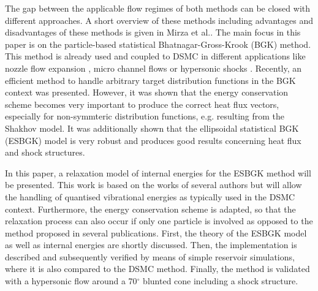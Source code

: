 \documentclass[aip,pof,amsmath,amssymb,preprint]{revtex4-1}
\begin{document}
The gap between the applicable flow regimes of both methods can be closed with different approaches. A short overview of these methods including advantages and disadvantages of these methods is given in Mirza et al.\cite{MIRZA2017269}. The main focus in this paper is on the particle-based statistical Bhatnagar-Gross-Krook (BGK) method. This method is already used and coupled to DSMC in different applications like nozzle flow expansion \cite[]{burt2006evaluation}, micro channel flows\cite[]{titov2008analysis} or hypersonic shocks \cite[]{tumuklu2016particle,Pfeiffer2018}. Recently, an efficient method to handle arbitrary target distribution functions in the BGK context was presented\cite{Pfeiffer2018}. However, it was shown that the energy conservation scheme becomes very important to produce the correct heat flux vectors, especially for non-symmteric distribution functions, e.g. resulting from the Shakhov model\cite{shakhov1968generalization}. It was additionally shown that the ellipsoidal statistical BGK (ESBGK) 
model\cite{holway1966new} is very robust and produces good results concerning heat flux and shock structures.

In this paper, a relaxation model of internal energies for the ESBGK method will be presented. This work is based on the works of several authors\cite{gallis2011investigation,tumuklu2016particle,burt2006evaluation} but will allow the handling of quantised vibrational
energies as typically used in the DSMC context. Furthermore, the energy conservation scheme is adapted, so that the relaxation process can also occur if only one particle is involved as opposed to the
method proposed in several publications\cite{tumuklu2016particle, burt2006evaluation}. First, the theory of the ESBGK model as well as internal energies are shortly discussed. Then, the implementation is described and subsequently verified by means of simple reservoir simulations, where it is also compared to the DSMC method. Finally, the method is validated with a hypersonic flow around
a 70$^\circ$ blunted cone including a shock structure.
\end{document}

